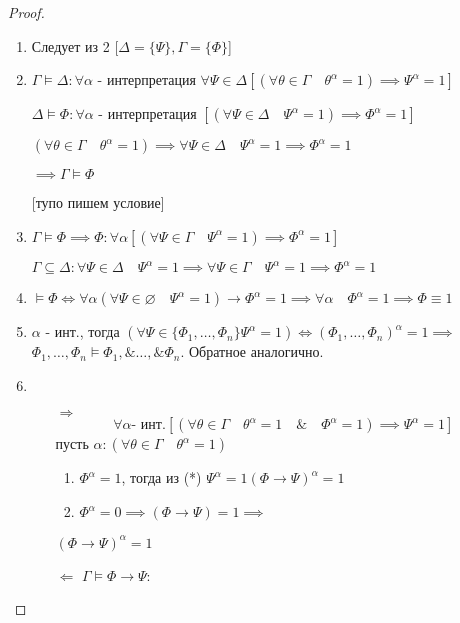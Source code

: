 \documentclass[a4paper]{article}
\theoremstyle{definition}
\theoremstyle{remark}
\begin{document}
    \begin{proof}
        \begin{enumerate}
            \item Следует из 2 [$\Delta= \{ \Psi\}, \Gamma = \{\Phi \}  $]
            \item $\Gamma \models \Delta: \forall \alpha$ - интерпретация $\forall \Psi \in \Delta [(\forall \theta \in \Gamma \quad \theta^\alpha = 1)\implies \Psi^\alpha = 1]$
            
            $\Delta \models \Phi: \forall \alpha$ - интерпретация $[(\forall \Psi \in \Delta \quad \Psi^\alpha = 1)\implies \Phi^\alpha = 1]$

            $(\forall \theta \in \Gamma \quad \theta^\alpha = 1)\implies \forall \Psi \in \Delta \quad \Psi^\alpha = 1\implies \Phi^\alpha = 1$

            $\implies \Gamma \models \Phi$

            [тупо пишем условие]
            \item $\Gamma \models \Phi\implies \Phi: \forall \alpha [(\forall \Psi \in \Gamma \quad \Psi^\alpha = 1)\implies \Phi^\alpha = 1]$
            
            $\Gamma \subseteq \Delta: \forall\Psi\in\Delta \quad \Psi^\alpha = 1\implies \forall\Psi\in\Gamma \quad \Psi^\alpha = 1\implies \Phi^\alpha = 1$
            \item $\models \Phi \Leftrightarrow \forall \alpha (\forall \Psi \in \varnothing\quad \Psi^\alpha = 1)\to \Phi^\alpha = 1 \implies \forall \alpha \quad \Phi^\alpha = 1\implies \Phi \equiv 1$
            \item $\alpha$ - инт., тогда $(\forall \Psi \in \{ \Phi_1, \dots, \Phi_n\} \Psi^\alpha = 1)\Leftrightarrow (\Phi_1, \dots, \Phi_n)^\alpha = 1\implies$
            $\Phi_1, \dots, \Phi_n\models \Phi_1,\& \dots,\& \Phi_n$.
            Обратное аналогично.
            \item \begin{itemize}
                \item[$\Rightarrow$]
                    \begin{equation}
                        \forall \alpha \text{- инт.}[(\forall \theta \in \Gamma\quad \theta^\alpha = 1\quad \&\quad \Phi^\alpha = 1)\implies \Psi^\alpha = 1]\tag{*}
                    \end{equation}    
                    пусть $\alpha: (\forall \theta \in \Gamma \quad \theta^\alpha = 1)$  
                    \begin{enumerate}
                        \item $\Phi^\alpha= 1$, тогда из (*) $\Psi^\alpha = 1 (\Phi\to \Psi)^\alpha = 1$
                        \item $\Phi^\alpha = 0\implies (\Phi\to\Psi) = 1\implies$
                    \end{enumerate}     
                    $(\Phi\to \Psi)^\alpha = 1$
                \item[$\Leftarrow$] $\Gamma \models \Phi\to \Psi:$
                

\end{itemize}
\end{enumerate}
\end{proof}
\end{document}
